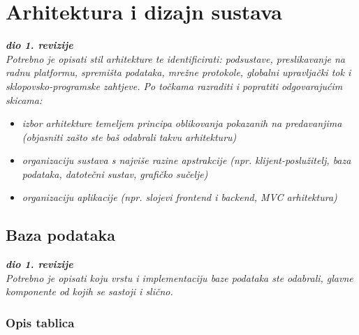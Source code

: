 \chapter{Arhitektura i dizajn sustava}
		
		\textbf{\textit{dio 1. revizije}}\\

		\textit{ Potrebno je opisati stil arhitekture te identificirati: podsustave, preslikavanje na radnu platformu, spremišta podataka, mrežne protokole, globalni upravljački tok i sklopovsko-programske zahtjeve. Po točkama razraditi i popratiti odgovarajućim skicama:}
	\begin{itemize}
		\item 	\textit{izbor arhitekture temeljem principa oblikovanja pokazanih na predavanjima (objasniti zašto ste baš odabrali takvu arhitekturu)}
		\item 	\textit{organizaciju sustava s najviše razine apstrakcije (npr. klijent-poslužitelj, baza podataka, datotečni sustav, grafičko sučelje)}
		\item 	\textit{organizaciju aplikacije (npr. slojevi frontend i backend, MVC arhitektura) }		
	\end{itemize}

	
		

		

				
		\section{Baza podataka}
			
			\textbf{\textit{dio 1. revizije}}\\
			
		\textit{Potrebno je opisati koju vrstu i implementaciju baze podataka ste odabrali, glavne komponente od kojih se sastoji i slično.}
		
			\subsection{Opis tablica}
			
